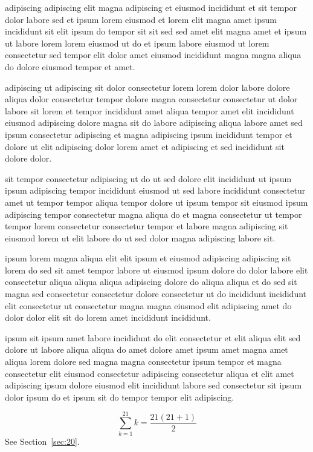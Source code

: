 \documentclass{article}
\begin{document}
adipiscing adipiscing elit magna adipiscing et eiusmod incididunt et sit tempor dolor labore sed et ipsum lorem eiusmod et lorem elit magna amet ipsum incididunt sit elit ipsum do tempor sit sit sed sed amet elit magna amet et ipsum ut labore lorem lorem eiusmod ut do et ipsum labore eiusmod ut lorem consectetur sed tempor elit dolor amet eiusmod incididunt magna magna aliqua do dolore eiusmod tempor et amet.

adipiscing ut adipiscing sit dolor consectetur lorem lorem dolor labore dolore aliqua dolor consectetur tempor dolore magna consectetur consectetur ut dolor labore sit lorem et tempor incididunt amet aliqua tempor amet elit incididunt eiusmod adipiscing dolore magna sit do labore adipiscing aliqua labore amet sed ipsum consectetur adipiscing et magna adipiscing ipsum incididunt tempor et dolore ut elit adipiscing dolor lorem amet et adipiscing et sed incididunt sit dolore dolor.

sit tempor consectetur adipiscing ut do ut sed dolore elit incididunt ut ipsum ipsum adipiscing tempor incididunt eiusmod ut sed labore incididunt consectetur amet ut tempor tempor aliqua tempor dolore ut ipsum tempor sit eiusmod ipsum adipiscing tempor consectetur magna aliqua do et magna consectetur ut tempor tempor lorem consectetur consectetur tempor et labore magna adipiscing sit eiusmod lorem ut elit labore do ut sed dolor magna adipiscing labore sit.

ipsum lorem magna aliqua elit elit ipsum et eiusmod adipiscing adipiscing sit lorem do sed sit amet tempor labore ut eiusmod ipsum dolore do dolor labore elit consectetur aliqua aliqua aliqua adipiscing dolore do aliqua aliqua et do sed sit magna sed consectetur consectetur dolore consectetur ut do incididunt incididunt elit consectetur ut consectetur magna magna eiusmod elit adipiscing amet do dolor dolor elit sit do lorem amet incididunt incididunt.

ipsum sit ipsum amet labore incididunt do elit consectetur et elit aliqua elit sed dolore ut labore aliqua aliqua do amet dolore amet ipsum amet magna amet aliqua lorem dolore sed magna magna consectetur ipsum tempor et magna consectetur elit eiusmod consectetur adipiscing consectetur aliqua et elit amet adipiscing ipsum dolore eiusmod elit incididunt labore sed consectetur sit ipsum dolor ipsum do et ipsum sit do tempor tempor elit adipiscing.

\begin{equation} \sum_{k=1}^{21} k = \frac{21(21+1)}{2} \end{equation}
See Section~\ref{sec:20}.
\end{document}
